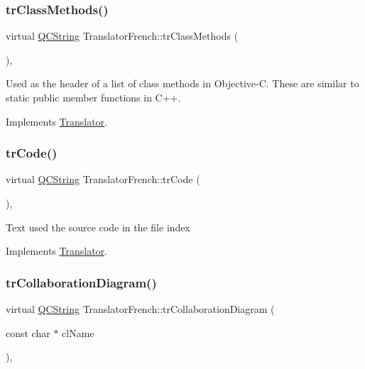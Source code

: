 \subsubsection{\texorpdfstring{trClassMethods()}{trClassMethods()}}
{\footnotesize\ttfamily virtual \mbox{\hyperlink{class_q_c_string}{Q\+C\+String}} Translator\+French\+::tr\+Class\+Methods (\begin{DoxyParamCaption}{ }\end{DoxyParamCaption})\hspace{0.3cm}{\ttfamily [inline]}, {\ttfamily [virtual]}}

Used as the header of a list of class methods in Objective-\/C. These are similar to static public member functions in C++. 

Implements \mbox{\hyperlink{class_translator}{Translator}}.

\mbox{\label{class_translator_french_ad6d53aff98d8f1ebc8fecef3627c4803}} 
\subsubsection{\texorpdfstring{trCode()}{trCode()}}
{\footnotesize\ttfamily virtual \mbox{\hyperlink{class_q_c_string}{Q\+C\+String}} Translator\+French\+::tr\+Code (\begin{DoxyParamCaption}{ }\end{DoxyParamCaption})\hspace{0.3cm}{\ttfamily [inline]}, {\ttfamily [virtual]}}

Text used the source code in the file index 

Implements \mbox{\hyperlink{class_translator}{Translator}}.

\mbox{\label{class_translator_french_ab08d60cffef4d76325494670f752a254}} 
\subsubsection{\texorpdfstring{trCollaborationDiagram()}{trCollaborationDiagram()}}
{\footnotesize\ttfamily virtual \mbox{\hyperlink{class_q_c_string}{Q\+C\+String}} Translator\+French\+::tr\+Collaboration\+Diagram (\begin{DoxyParamCaption}\item[{const char $\ast$}]{cl\+Name }\end{DoxyParamCaption})\hspace{0.3cm}{\ttfamily [inline]}, {\ttfamily [virtual]}}

